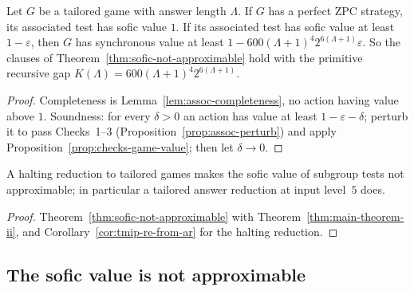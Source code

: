 \begin{theorem}
\label{thm:main-theorem-ii}
\leanok
Let $G$ be a tailored game with answer length $\Lambda$. If $G$ has a perfect ZPC strategy, its
associated test has sofic value $1$. If its associated test has sofic value at least
$1 - \varepsilon$, then $G$ has synchronous value at least $1 - 600 (\Lambda+1)^4 2^{6(\Lambda+1)}
\varepsilon$. So the clauses of Theorem~\ref{thm:sofic-not-approximable} hold with the primitive
recursive gap $K(\Lambda) = 600 (\Lambda+1)^4 2^{6(\Lambda+1)}$.
\end{theorem}

\begin{proof}
\leanok
Completeness is Lemma~\ref{lem:assoc-completeness}, no action having value above $1$. Soundness:
for every $\delta > 0$ an action has value at least $1 - \varepsilon - \delta$; perturb it to pass
Checks~1--3 (Proposition~\ref{prop:assoc-perturb}) and apply
Proposition~\ref{prop:checks-game-value}; then let $\delta \to 0$.
\end{proof}

\begin{corollary}
\label{cor:sofic-not-approximable-ar}
\leanok
A halting reduction to tailored games makes the sofic value of subgroup tests not approximable;
in particular a tailored answer reduction at input level~$5$ does.
\end{corollary}

\begin{proof}
\leanok
Theorem~\ref{thm:sofic-not-approximable} with Theorem~\ref{thm:main-theorem-ii}, and
Corollary~\ref{cor:tmip-re-from-ar} for the halting reduction.
\end{proof}

\subsection{The sofic value is not approximable}

